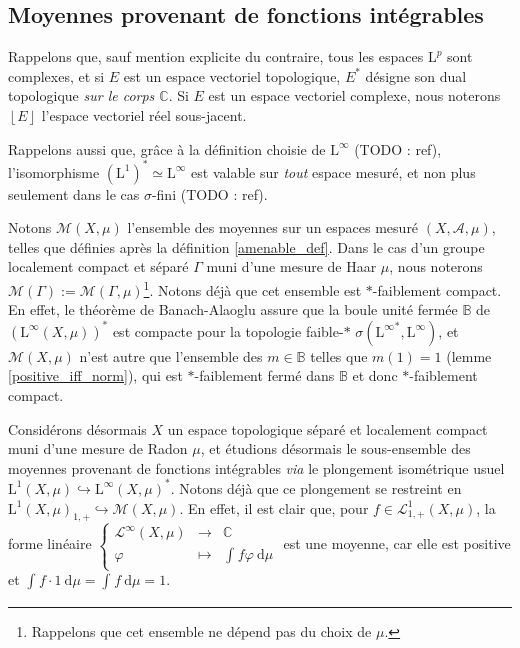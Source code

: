 \documentclass[a4paper,12pt]{article}
\newcommand{\C}{\mathbb{C}}
\newcommand{\norm}[1]{\left\Vert #1\right\Vert}
\newcommand{\floor}[1]{\left\lfloor #1 \right\rfloor}
\newcommand{\integral}[4]{\int_{#1}^{#2} #3~\mathrm{d}#4}
\newcommand\funlam[2]{\left\{\begin{array}{ccc}#1\\#2\end{array}\right.}
\newcommand{\nhds}{\mathcal{N}}
\newcommand{\TODO}[1]{{\color{red}TODO :} #1}
\begin{document}

\subsection{Moyennes provenant de fonctions intégrables}

Rappelons que, sauf mention explicite du contraire, tous les espaces $\mathrm{L}^p$ sont complexes, et
si $E$ est un espace vectoriel topologique, $E^*$ désigne son dual topologique \emph{sur le corps $\C$}. Si
$E$ est un espace vectoriel complexe, nous noterons $\floor{E}$ l'espace vectoriel réel sous-jacent.

Rappelons aussi que, grâce à la définition choisie de $\mathrm{L}^\infty$ (\TODO{ref}), l'isomorphisme $(\mathrm{L}^1)^* \simeq \mathrm{L}^\infty$
est valable sur \emph{tout} espace mesuré, et non plus seulement dans le cas $\sigma$-fini (\TODO{ref}).

Notons $\mathcal{M}(X,\mu)$ l'ensemble des moyennes sur un espaces mesuré $(X,\mathcal{A},\mu)$, telles que définies après la définition \ref{amenable_def}.
Dans le cas d'un groupe localement compact et séparé $\Gamma$ muni d'une mesure de Haar $\mu$, nous noterons
$\mathcal{M}(\Gamma):=\mathcal{M}(\Gamma, \mu)$\footnote{Rappelons que cet ensemble ne dépend pas du choix de $\mu$.}. Notons déjà que cet ensemble est
$\ast$-faiblement compact. En effet, le théorème de Banach-Alaoglu assure que la boule unité fermée $\mathbb{B}$
de $\left(\mathrm{L}^\infty(X, \mu)\right)^*$ est compacte pour la topologie faible-$*$ $\sigma({\mathrm{L}^\infty}^*, \mathrm{L}^\infty)$,
et $\mathcal{M}(X, \mu)$ n'est autre que l'ensemble des $m\in\mathbb{B}$ telles que $m(1) = 1$ (lemme \ref{positive_iff_norm}),
qui est $*$-faiblement fermé dans $\mathbb{B}$ et donc $*$-faiblement compact.

Considérons désormais $X$ un espace topologique séparé et localement compact muni d'une mesure de Radon $\mu$, et 
étudions désormais le sous-ensemble des moyennes provenant de fonctions intégrables \emph{via} le plongement isométrique usuel $\mathrm{L}^1(X,\mu)\hookrightarrow\mathrm{L}^\infty(X,\mu)^*$.
Notons déjà que ce plongement se restreint en $\mathrm{L}^1(X, \mu)_{1, +}\hookrightarrow \mathcal{M}(X, \mu)$.
En effet, il est clair que, pour $f\in\mathscr{L}^1_{1, +}(X, \mu)$, la forme linéaire $\funlam{\mathscr{L}^\infty(X,\mu)&\to&\C}{ \varphi &\mapsto&\integral{}{}{f\varphi}{\mu}}$ est une moyenne,
car elle est positive et $\integral{}{}{f\cdot 1}{\mu} = \integral{}{}{f}{\mu} = 1$.
\end{document}
